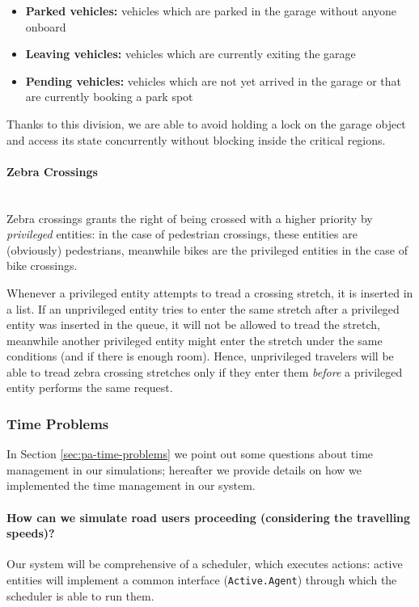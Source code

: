 \begin{itemize}
  \item \textbf{Parked vehicles:} vehicles which are parked in the garage
    without anyone onboard
  \item \textbf{Leaving vehicles:} vehicles which are currently exiting the
    garage
  \item \textbf{Pending vehicles:} vehicles which are not yet arrived in the
    garage or that are currently booking a park spot
\end{itemize}

Thanks to this division, we are able to avoid holding a lock on the garage
object and access its state concurrently without blocking inside the critical
regions.

\paragraph{Zebra Crossings} \mbox{} \\
Zebra crossings grants the right of being crossed with a higher priority by
\textit{privileged} entities: in the case of pedestrian crossings, these
entities are (obviously) pedestrians, meanwhile bikes are the privileged
entities in the case of bike crossings.

Whenever a privileged entity attempts to tread a crossing stretch, it is
inserted in a list. If an unprivileged entity tries to enter the same stretch
after a privileged entity was inserted in the queue, it will not be allowed to
tread the stretch, meanwhile another privileged entity might enter the stretch
under the same conditions (and if there is enough room).
Hence, unprivileged travelers will be able to tread zebra crossing stretches
only if they enter them \textit{before} a privileged entity performs the same
request.



\subsubsection{Time Problems}

In Section \ref{sec:pa-time-problems} we point out some questions
about time management in our simulations; hereafter we provide
details on how we implemented the time management in our system.

\paragraph{How can we simulate road users proceeding (considering the
travelling speeds)?}
Our system will be comprehensive of a scheduler, which executes actions:
active entities will implement a common interface (\texttt{Active.Agent})
through which the scheduler is able to run them.

